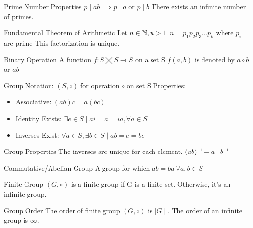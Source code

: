 \begin{flashcard}[Definition]{Prime Number Properties}
  $p \mid ab \implies p \mid a \text{ or } p \mid b$
  \vfill
  There exists an infinite number of primes.
\end{flashcard}

\begin{flashcard}[Definition]{Fundamental Theorem of Arithmetic}
  Let $n \in \mathbb{N}, n > 1$
  \vfill
  $n = p_1p_2p_3 \dots p_k$ where $p_i$ are prime
  \vfill
  This factorization is unique.
\end{flashcard}

\begin{flashcard}[Definition]{Binary Operation}
  A function $f: S \bigtimes S \to S$ on a set S
  \vfill
  $f(a,b)$ is denoted by $a \circ b$ or  $ab$
\end{flashcard}

\begin{flashcard}[Definition]{Group}
  Notation: $(S, \circ)$ for operation $\circ$ on set S
  \vfill
  Properties:
  \begin{itemize}
    \item Associative: $(ab)c = a(bc)$
    \item Identity Exists: $\exists e \in S \mid ai = a = ia, \forall a \in S$
    \item Inverses Exist: $\forall a \in S, \exists b \in S \mid ab = e = be$
  \end{itemize}
\end{flashcard}

\begin{flashcard}[Definition]{Group Properties}
  The inverses are unique for each element.
  \vfill
  $\inv{(ab)} = \inv{a}\inv{b}$
\end{flashcard}

\begin{flashcard}[Definition]{Commutative/Abelian Group}
  A group for which $ab = ba\ \forall a,b \in S$
\end{flashcard}

\begin{flashcard}[Definition]{Finite Group}
  $(G,\circ)$ is a finite group if G is a finite set.
  \vfill
  Otherwise, it's an infinite group.
\end{flashcard}

\begin{flashcard}[Definition]{Group Order}
  The order of finite group $(G,\circ)$ is $\mid G \mid$.
  \vfill
  The order of an infinite group is $\infty$.
\end{flashcard}

